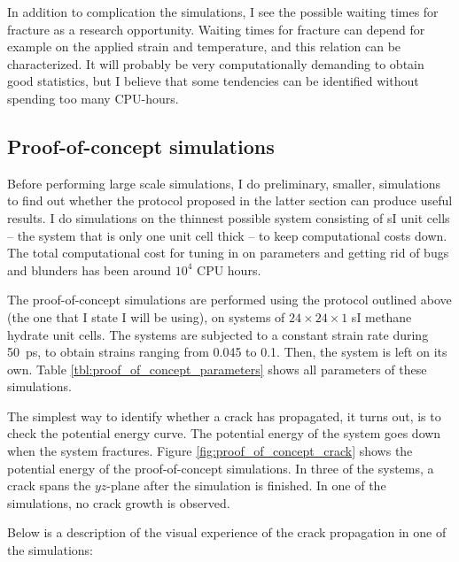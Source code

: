 In addition to complication the simulations, I see the possible waiting times for fracture as a research opportunity. Waiting times for fracture can depend for example on the applied strain and temperature, and this relation can be characterized. It will probably be very computationally demanding to obtain good statistics, but I believe that some tendencies can be identified without spending too many CPU-hours.

\subsection{Proof-of-concept simulations}
Before performing large scale simulations, I do preliminary, smaller, simulations to find out whether the protocol proposed in the latter section can produce useful results. I do simulations on the thinnest possible system consisting of sI unit cells -- the system that is only one unit cell thick -- to keep computational costs down. The total computational cost for tuning in on parameters and getting rid of bugs and blunders has been around $10^4$ CPU hours.

The proof-of-concept simulations are performed using the protocol outlined above (the one that I state I will be using), on systems of $24\times 24\times 1$ sI methane hydrate unit cells. The systems are subjected to a constant strain rate during \SI{50}{\pico\second}, to obtain strains ranging from 0.045 to 0.1. Then, the system is left on its own. Table \ref{tbl:proof_of_concept_parameters} shows all parameters of these simulations.

The simplest way to identify whether a crack has propagated, it turns out, is to check the potential energy curve. The potential energy of the system goes down when the system fractures. Figure \ref{fig:proof_of_concept_crack} shows the potential energy of the proof-of-concept simulations. In three of the systems, a crack spans the $yz$-plane after the simulation is finished. In one of the simulations, no crack growth is observed.

Below is a description of the visual experience of the crack propagation in one of the simulations:

